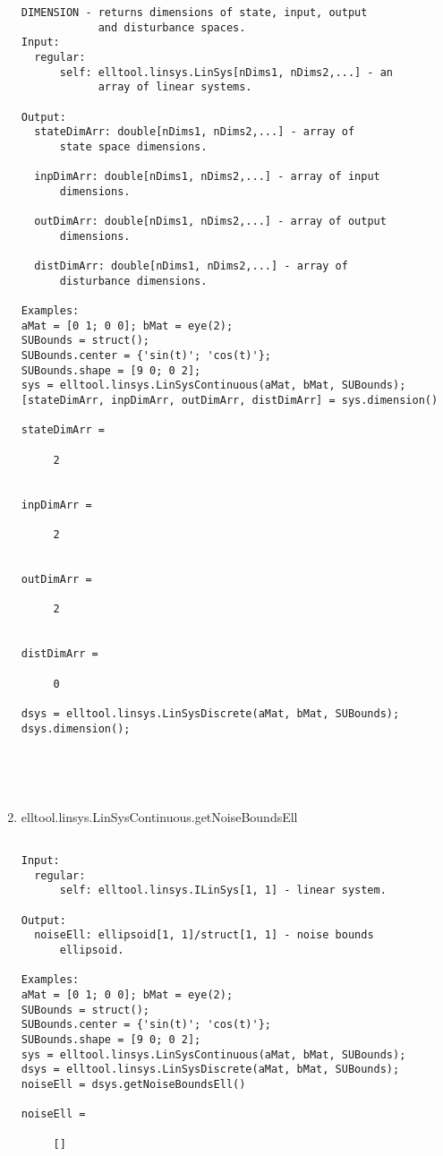 \begin{enumerate}
\begin{lstlisting}
DIMENSION - returns dimensions of state, input, output
            and disturbance spaces.
Input:
  regular:
      self: elltool.linsys.LinSys[nDims1, nDims2,...] - an
            array of linear systems.

Output:
  stateDimArr: double[nDims1, nDims2,...] - array of
      state space dimensions.

  inpDimArr: double[nDims1, nDims2,...] - array of input
      dimensions.

  outDimArr: double[nDims1, nDims2,...] - array of output
      dimensions.

  distDimArr: double[nDims1, nDims2,...] - array of
      disturbance dimensions.

Examples:
aMat = [0 1; 0 0]; bMat = eye(2);
SUBounds = struct();
SUBounds.center = {'sin(t)'; 'cos(t)'};
SUBounds.shape = [9 0; 0 2];
sys = elltool.linsys.LinSysContinuous(aMat, bMat, SUBounds);
[stateDimArr, inpDimArr, outDimArr, distDimArr] = sys.dimension()

stateDimArr =

     2


inpDimArr =

     2


outDimArr =

     2


distDimArr =

     0

dsys = elltool.linsys.LinSysDiscrete(aMat, bMat, SUBounds);
dsys.dimension();





\end{lstlisting}
\fontfamily{\familydefault}
\selectfont
\item {elltool.linsys.LinSysContinuous.getNoiseBoundsEll}
\selectfont
\begin{lstlisting}

Input:
  regular:
      self: elltool.linsys.ILinSys[1, 1] - linear system.

Output:
  noiseEll: ellipsoid[1, 1]/struct[1, 1] - noise bounds
      ellipsoid.

Examples:
aMat = [0 1; 0 0]; bMat = eye(2);
SUBounds = struct();
SUBounds.center = {'sin(t)'; 'cos(t)'};
SUBounds.shape = [9 0; 0 2];
sys = elltool.linsys.LinSysContinuous(aMat, bMat, SUBounds);
dsys = elltool.linsys.LinSysDiscrete(aMat, bMat, SUBounds);
noiseEll = dsys.getNoiseBoundsEll()

noiseEll =

     []






\end{lstlisting}
\end{enumerate}

